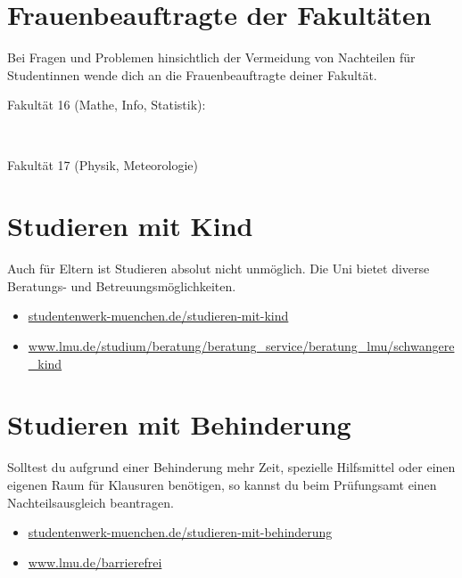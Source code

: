 \section{Frauenbeauftragte der Fakultäten}
Bei Fragen und Problemen hinsichtlich der Vermeidung von Nachteilen für Studentinnen
wende dich an die Frauenbeauftragte deiner Fakultät.

Fakultät 16 (Mathe, Info, Statistik): \newline
\begin{urlList}
	\\
\end{urlList}

Fakultät 17 (Physik, Meteorologie)\newline
\begin{urlList}
\end{urlList}

\section{Studieren mit Kind}

Auch für Eltern ist Studieren absolut nicht unmöglich. Die Uni bietet diverse Beratungs- und Betreuungsmöglichkeiten.

\begin{itemize}
	\item \url{studentenwerk-muenchen.de/studieren-mit-kind}
	\item \url{www.lmu.de/studium/beratung/beratung_service/beratung_lmu/schwangere_kind}
\end{itemize}

\section{Studieren mit Behinderung}

Solltest du aufgrund einer Behinderung mehr Zeit, spezielle Hilfsmittel oder einen eigenen Raum für Klausuren benötigen, so kannst du beim Prüfungsamt einen Nachteilsausgleich beantragen.

\begin{itemize}
	\item \url{studentenwerk-muenchen.de/studieren-mit-behinderung}
	\item \url{www.lmu.de/barrierefrei}
\end{itemize}



